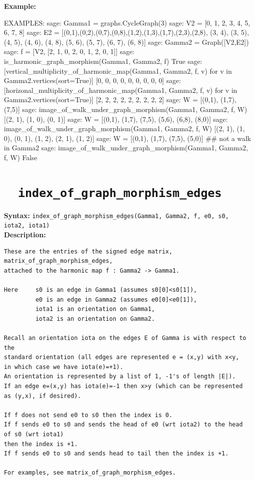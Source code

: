 \documentclass{article}
\begin{document}
\textbf{Example:}
{\small{    
\begin{spverbatim}
EXAMPLES:
    sage: Gamma1 = graphs.CycleGraph(3)
    sage: V2 = [0, 1, 2, 3, 4, 5, 6, 7, 8]
    sage: E2 = [(0,1),(0,2),(0,7),(0,8),(1,2),(1,3),(1,7),(2,3),(2,8), (3, 4), (3, 5), (4, 5), (4, 6), (4, 8), (5, 6), (5, 7), (6, 7), (6, 8)]
    sage: Gamma2 = Graph([V2,E2])
    sage: f = [V2, [2, 1, 0, 2, 0, 1, 2, 0, 1]]
    sage: is_harmonic_graph_morphism(Gamma1, Gamma2, f)
    True
    sage: [vertical_multiplicity_of_harmonic_map(Gamma1, Gamma2, f, v) for v in Gamma2.vertices(sort=True)]
    [0, 0, 0, 0, 0, 0, 0, 0, 0]
    sage: [horizonal_multiplicity_of_harmonic_map(Gamma1, Gamma2, f, v) for v in Gamma2.vertices(sort=True)]
    [2, 2, 2, 2, 2, 2, 2, 2, 2]
    sage: W = [(0,1), (1,7), (7,5)]
    sage: image_of_walk_under_graph_morphism(Gamma1, Gamma2, f, W)
    [(2, 1), (1, 0), (0, 1)]
    sage: W = [(0,1), (1,7), (7,5), (5,6), (6,8), (8,0)]
    sage: image_of_walk_under_graph_morphism(Gamma1, Gamma2, f, W)
    [(2, 1), (1, 0), (0, 1), (1, 2), (2, 1), (1, 2)]
    sage: W = [(0,1), (1,7), (7,5), (5,0)] ## not a walk in Gamma2
    sage: image_of_walk_under_graph_morphism(Gamma1, Gamma2, f, W)
    False
\end{spverbatim}
}}

\section{\tt \ \  index\_of\_graph\_morphism\_edges}
\textbf{Syntax:} \verb}index_of_graph_morphism_edges(Gamma1, Gamma2, f, e0, s0, iota2, iota1)}\\

\textbf{Description:}
\begin{verbatim}
These are the entries of the signed edge matrix, matrix_of_graph_morphism_edges,
attached to the harmonic map f : Gamma2 -> Gamma1.

Here     s0 is an edge in Gamma1 (assumes s0[0]<s0[1]),
         e0 is an edge in Gamma2 (assumes e0[0]<e0[1]),
         iota1 is an orientation on Gamma1,
         iota2 is an orientation on Gamma2. 
    
Recall an orientation iota on the edges E of Gamma is with respect to the 
standard orientation (all edges are represented e = (x,y) with x<y, 
in which case we have iota(e)=+1). 
An orientation is represented by a list of 1, -1's of length |E|).
If an edge e=(x,y) has iota(e)=-1 then x>y (which can be represented as (y,x), if desired).
    
If f does not send e0 to s0 then the index is 0.
If f sends e0 to s0 and sends the head of e0 (wrt iota2) to the head of s0 (wrt iota1) 
then the index is +1.
If f sends e0 to s0 and sends head to tail then the index is +1.

For examples, see matrix_of_graph_morphism_edges.
\end{verbatim}
\end{document}
